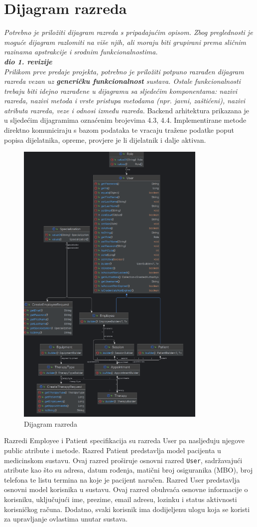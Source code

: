			
		\section{Dijagram razreda}
		
			\textit{Potrebno je priložiti dijagram razreda s pripadajućim opisom. Zbog preglednosti je moguće dijagram razlomiti na više njih, ali moraju biti grupirani prema sličnim razinama apstrakcije i srodnim funkcionalnostima.}\\
			
			\textbf{\textit{dio 1. revizije}}\\
   
			\textit{Prilikom prve predaje projekta, potrebno je priložiti potpuno razrađen dijagram razreda vezan uz \textbf{generičku funkcionalnost} sustava. Ostale funkcionalnosti trebaju biti idejno razrađene u dijagramu sa sljedećim komponentama: nazivi razreda, nazivi metoda i vrste pristupa metodama (npr. javni, zaštićeni), nazivi atributa razreda, veze i odnosi između razreda.}\newline
   Backend arhitektura prikazana je u sljedećim dijagramima oznaćenim brojevima 4.3, 4.4.
   Implementirane metode direktno komuniciraju s bazom podataka te vracaju tražene podatke  poput popisa dijelatnika, opreme, provjere je li dijelatnik i dalje aktivan.
		   \begin{figure}[H]
    \centering
    \includegraphics[width=0.5\linewidth]{slike/razredi1.png}
    \caption{Dijagram razreda}
    \label{fig:enter-label}
\end{figure}
Razredi Employee i Patient  specifikacija su razreda User pa nasljeđuju njegove public atribute i metode.
Razred Patient predstavlja model pacijenta u medicinskom sustavu. Ovaj razred proširuje osnovni razred \verb|User|, sadržavajući atribute kao što su adresa, datum rođenja, matični broj osiguranika (MBO), broj telefona te listu termina na koje je pacijent naručen.  \newline
Razred User predstavlja osnovni model korisnika u sustavu. Ovaj razred obuhvaća osnovne informacije o korisniku, uključujući ime, prezime, email adresu, lozinku i status aktivnosti korisničkog računa. Dodatno, svaki korisnik ima dodijeljenu ulogu koja se koristi za upravljanje ovlastima unutar sustava. \newline


